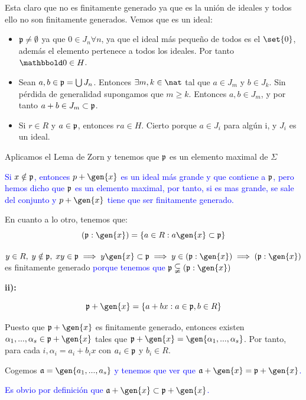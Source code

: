 \begin{problem}[1]
	Esta claro que no es finitamente generado ya que es la unión de ideales y todos ello no son finitamente generados. Vemos que es un ideal:
	\begin{itemize}
		\item $\mathfrak{p} \neq \emptyset$ ya que $0 \in J_n \forall n$, ya que el ideal más pequeño de todos es el $\set{0}$, además el elemento \zero pertenece a todos los ideales. Por tanto $\zero \in H$.
		\item Sean $a,b \in \mathfrak{p}=\bigcup J_n$.  Entonces $\exists m,k \in \nat$ tal que $a \in J_m$ y $b \in J_k$. Sin pérdida de generalidad supongamos que $m \geq k$. Entonces $a,b \in J_m$, y por tanto $a+b \in J_m \subset \mathfrak{p}$.
		\item Si $r\in R$ y $a \in \mathfrak{p}$, entonces $ra \in H$. Cierto porque $a \in J_i$ para algún i, y $J_i$ es un ideal.
	\end{itemize}

	Aplicamos el Lema de Zorn y tenemos que $\mathfrak{p}$ es un elemento maximal de $\Sigma$

	\spart

	
	\textcolor{blue}{Si $x \notin \mathfrak{p}$, entonces $p+\gen{x}$ es un ideal más grande y que contiene a $\mathfrak{p}$, pero hemos dicho que $\mathfrak{p}$ es un elemento maximal, por tanto, si es mas grande, se sale del conjunto y  $p +\gen{x}$ tiene que ser finitamente generado. }

	En cuanto a lo otro, tenemos que:
	$$(\pideal:\gen{x})=\{a \in R : a\gen{x} \subset \pideal \}$$

	$y \in R, \; y \notin \pideal, \; xy \in \pideal \implies y\gen{x} \subset \pideal \implies y \in (\pideal:\gen{x}) \implies (\pideal:\gen{x})$ es finitamente generado \textcolor{blue}{porque tenemos que $\pideal \subsetneqq (\pideal:\gen{x})$}

	\textbf{ii):}

	$$\pideal + \gen{x} = \{ a + bx: a \in \pideal, b \in R \} $$

	Puesto que $\pideal + \gen{x}$ es finitamente generado, entonces existen $\alpha_1,...,\alpha_s \in \pideal + \gen{x}$ tales que $\pideal + \gen{x} = \gen{\alpha_1,...,\alpha_s}$. Por tanto, para cada $i, \alpha_i=a_i +b_ix$ con $a_i \in \mathfrak{p}$ y $b_i \in R$.

	Cogemos $\aideal = \gen{a_1,...,a_s}$ \textcolor{blue}{y tenemos que ver que $\aideal + \gen{x} = \pideal + \gen{x}$.}
	
	\textcolor{blue}{Es obvio por definición que $\aideal + \gen{x} \subset \pideal + \gen{x}$.}
	

\end{problem}
